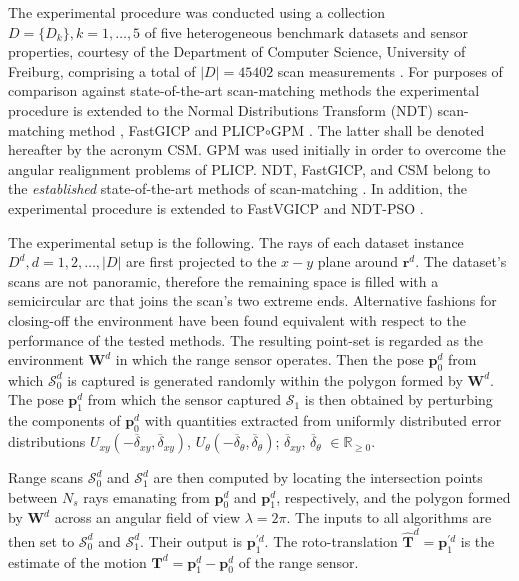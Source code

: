 The experimental procedure was conducted using a collection $D = \{D_k\}, k =
1,\dots,5$ of five heterogeneous benchmark datasets and sensor properties,
courtesy of the Department of Computer Science, University of Freiburg,
comprising a total of $|D| = 45402$ scan measurements \cite{datasets_link}.
For purposes of comparison against state-of-the-art scan-matching methods the
experimental procedure is extended to the Normal Distributions Transform (NDT)
scan-matching method \cite{Biber}, FastGICP \cite{Segal2009} and
PLICP$\circ$GPM \cite{Censi2008b}. The latter shall be denoted hereafter by the
acronym CSM. GPM \cite{Censi} was used initially in order to overcome the
angular realignment problems \cite{Censi2008b} of PLICP. NDT, FastGICP, and CSM
belong to the \textit{established} state-of-the-art methods of scan-matching
\cite{Koide2021,Xu2018a,Sobreira2019a,Pishehvari2019a,Qingshan2019a,Pham2021a}.
In addition, the experimental procedure is extended to FastVGICP
\cite{Pham2021a} and NDT-PSO \cite{Bouraine2020}.

The experimental setup is the following. The rays of each dataset instance
$D^d, d = 1,2,\dots,|D|$ are first projected to the $x-y$ plane around
$\bm{r}^d$.  The dataset's scans are not panoramic, therefore the remaining
space is filled with a semicircular arc that joins the scan's two extreme ends.
Alternative fashions for closing-off the environment have been found equivalent
with respect to the performance of the tested methods. The resulting point-set
is regarded as the environment $\bm{W}^d$ in which the range sensor operates.
Then the pose $\bm{p}_0^d$ from which $\mathcal{S}_0^d$ is captured is
generated randomly within the polygon formed by $\bm{W}^d$. The pose
$\bm{p}_1^d$ from which the sensor captured $\mathcal{S}_1$ is then obtained by
perturbing the components of $\bm{p}_0^d$ with quantities extracted from
uniformly distributed error distributions $U_{xy}(-\overline{\delta}_{xy},
\overline{\delta}_{xy})$, $U_{\theta}(-\overline{\delta}_{\theta},
\overline{\delta}_{\theta})$; $\overline{\delta}_{xy}$,
$\overline{\delta}_\theta$ $\in \mathbb{R}_{\geq 0}$.

Range scans $\mathcal{S}_0^d$ and $\mathcal{S}_1^d$ are then computed by
locating the intersection points between $N_s$ rays emanating from $\bm{p}_0^d$
and $\bm{p}_1^d$, respectively, and the polygon formed by $\bm{W}^d$ across an
angular field of view $\lambda = 2\pi$. The inputs to all algorithms are
then set to $\mathcal{S}_0^d$ and $\mathcal{S}_1^d$. Their output is
$\bm{p}_1^{\prime d}$. The roto-translation
$\hat{\bm{T}}^d = \bm{p}_1^{\prime d}$ is the estimate of the motion
$\bm{T}^d = \bm{p}_1^d - \bm{p}_0^d$ of the range sensor.

